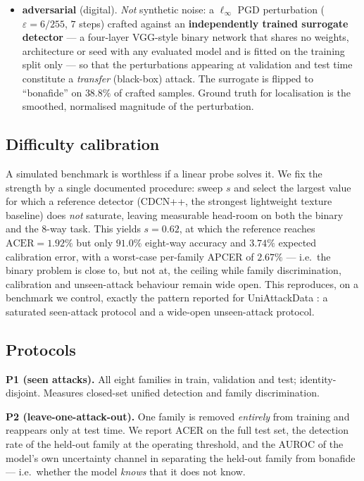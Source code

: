 \documentclass[conference]{IEEEtran}
\begin{document}
\begin{itemize}
      radial peak injected into the Fourier magnitude \cite{frank2020frequency}.
\item \textbf{adversarial} (digital). \emph{Not} synthetic noise: a
      $\ell_\infty$ PGD perturbation ($\varepsilon=6/255$, $7$ steps)
      \cite{madry2018pgd} crafted against an \textbf{independently trained
      surrogate detector} --- a four-layer VGG-style binary network that shares no
      weights, architecture or seed with any evaluated model and is fitted on the
      training split only --- so that the perturbations appearing at validation and
      test time constitute a \emph{transfer} (black-box) attack. The surrogate is
      flipped to ``bonafide'' on $38.8\%$ of crafted samples. Ground truth for
      localisation is the smoothed, normalised magnitude of the perturbation.
\end{itemize}

\subsection{Difficulty calibration}
A simulated benchmark is worthless if a linear probe solves it. We fix the strength
by a single documented procedure: sweep $s$ and select the largest value for which
a reference detector (CDCN++, the strongest lightweight texture baseline) does
\emph{not} saturate, leaving measurable head-room on both the binary and the
$8$-way task. This yields $s=0.62$, at which the reference reaches
$\mathrm{ACER}=1.92\%$ but only $91.0\%$ eight-way accuracy and $3.74\%$ expected
calibration error, with a worst-case per-family APCER of $2.67\%$ --- i.e.\ the
binary problem is close to, but not at, the ceiling while family discrimination,
calibration and unseen-attack behaviour remain wide open. This reproduces, on a
benchmark we control, exactly the pattern reported for UniAttackData
\cite{yu2024unified}: a saturated seen-attack protocol and a wide-open unseen-attack
protocol.

\subsection{Protocols}
\textbf{P1 (seen attacks).} All eight families in train, validation and test;
identity-disjoint. Measures closed-set unified detection and family
discrimination.

\textbf{P2 (leave-one-attack-out).} One family is removed \emph{entirely} from
training and reappears only at test time. We report ACER on the full test set, the
detection rate of the held-out family at the operating threshold, and the AUROC of
the model's own uncertainty channel in separating the held-out family from
bonafide --- i.e.\ whether the model \emph{knows} that it does not know.
\end{document}
